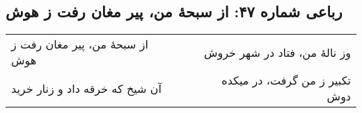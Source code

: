 \begin{center}
\section*{رباعی شماره ۴۷: از سبحهٔ من، پیر مغان رفت ز هوش}
\label{sec:047}
\begin{longtable}{l p{0.5cm} r}
از سبحهٔ من، پیر مغان رفت ز هوش
&&
وز نالهٔ من، فتاد در شهر خروش
\\
آن شیخ که خرقه داد و زنار خرید
&&
تکبیر ز من گرفت، در میکده دوش
\\
\end{longtable}
\end{center}
